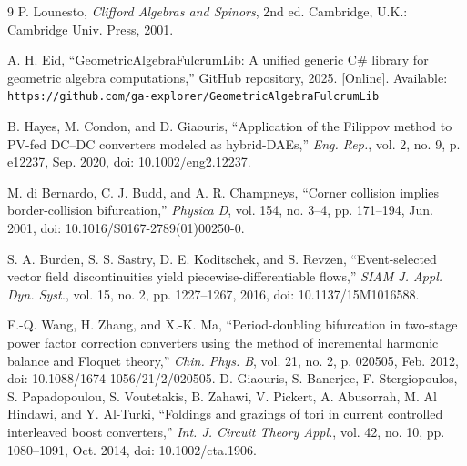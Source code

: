 \documentclass[journal]{IEEEtran}
\begin{document}
\begin{thebibliography}{9}
 P. Lounesto, \emph{Clifford Algebras and Spinors},
2nd ed. Cambridge, U.K.: Cambridge Univ. Press, 2001.

 A. H. Eid, ``GeometricAlgebraFulcrumLib: A unified
generic C\# library for geometric algebra computations,'' GitHub repository,
2025. [Online]. Available:
\texttt{https://github.com/\allowbreak{}ga-explorer/\allowbreak{}GeometricAlgebraFulcrumLib}

 B. Hayes, M. Condon, and D. Giaouris,
``Application of the Filippov method to PV-fed DC--DC converters modeled as
hybrid-DAEs,'' \emph{Eng. Rep.}, vol. 2, no. 9, p. e12237, Sep. 2020,
doi: 10.1002/eng2.12237.

 M. di Bernardo, C. J. Budd, and
A. R. Champneys, ``Corner collision implies border-collision bifurcation,''
\emph{Physica D}, vol. 154, no. 3--4, pp. 171--194, Jun. 2001,
doi: 10.1016/S0167-2789(01)00250-0.

 S. A. Burden, S. S. Sastry, D. E. Koditschek, and
S. Revzen, ``Event-selected vector field discontinuities yield
piecewise-differentiable flows,'' \emph{SIAM J. Appl. Dyn. Syst.}, vol. 15,
no. 2, pp. 1227--1267, 2016, doi: 10.1137/15M1016588.

 F.-Q. Wang, H. Zhang, and X.-K. Ma,
``Period-doubling bifurcation in two-stage power factor correction converters
using the method of incremental harmonic balance and Floquet theory,''
\emph{Chin. Phys. B}, vol. 21, no. 2, p. 020505, Feb. 2012,
doi: 10.1088/1674-1056/21/2/020505.
 D. Giaouris, S. Banerjee, F. Stergiopoulos,
S. Papadopoulou, S. Voutetakis, B. Zahawi, V. Pickert, A. Abusorrah,
M. Al Hindawi, and Y. Al-Turki, ``Foldings and grazings of tori in current
controlled interleaved boost converters,'' \emph{Int. J. Circuit Theory
Appl.}, vol. 42, no. 10, pp. 1080--1091, Oct. 2014, doi: 10.1002/cta.1906.

\end{thebibliography}
\end{document}
